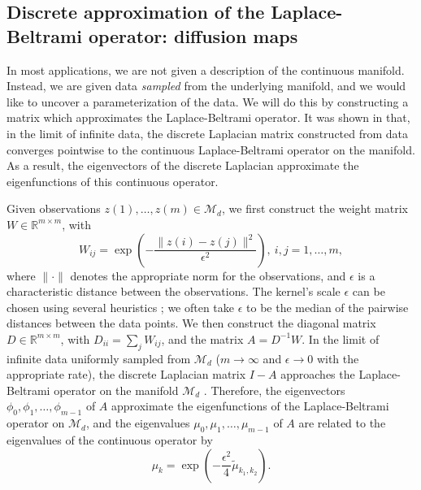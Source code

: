 \documentclass[3p]{elsarticle}
\begin{document}
\subsection{Discrete approximation of the Laplace-Beltrami operator: diffusion maps}

In most applications, we are not given a description of the continuous manifold. 
%
Instead, we are given data {\em sampled} from the underlying manifold, and we would like to uncover a parameterization of the data.
%
We will do this by constructing a matrix which approximates the Laplace-Beltrami operator. 
%
It was shown in \cite{coifman2006geometric} that, in the limit of infinite data, the discrete Laplacian matrix constructed from data converges pointwise to the continuous Laplace-Beltrami operator on the manifold. 
%
As a result, the eigenvectors of the discrete Laplacian approximate the eigenfunctions of this continuous operator.

Given observations $z(1), \dots, z(m) \in \mathcal{M}_d$, we first construct the weight matrix $W \in \mathbb{R}^{m \times m}$, with
\begin{equation} \label{eq:W}
W_{ij} = \exp \left( -\frac{\|z(i) - z(j) \|^2}{\epsilon^2} \right), \ i,j=1,\ldots,m,
\end{equation}
where $\| \cdot \|$ denotes the appropriate norm for the observations, and $\epsilon$ is a characteristic distance between the observations. 
%
The kernel's scale $\epsilon$ can be chosen using several heuristics \cite{coifman2008graph, rohrdanz2011determination}; we often take $\epsilon$ to be the median of the pairwise distances between the data points.
%
We then construct the diagonal matrix $D \in \mathbb{R}^{m \times m}$, with $D_{ii} = \sum_j W_{ij}$, and the matrix $A  = D^{-1} W.$
%
In the limit of infinite data uniformly sampled from $\mathcal{M}_d$ ($m \rightarrow \infty$ and $\epsilon \rightarrow 0$ with the appropriate rate), the discrete Laplacian matrix $I-A$ approaches the Laplace-Beltrami operator on the manifold $\mathcal{M}_d$ \cite{coifman2006geometric}. 
%
Therefore, the eigenvectors $\phi_0, \phi_1, \dots, \phi_{m-1}$ of $A$ approximate the eigenfunctions of the Laplace-Beltrami operator on $\mathcal{M}_d$,
and the eigenvalues $\mu_0, \mu_1, \dots, \mu_{m-1}$ of $A$ are related to the eigenvalues of the continuous operator by 
\begin{equation} \label{eq:evals_relationship}
\mu_k = \exp \left( -\frac{\epsilon^2}{4} \tilde{\mu}_{k_1, k_2}  \right).
\end{equation}
\end{document}
